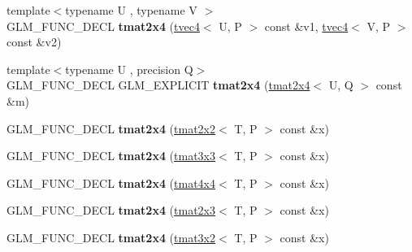 \begin{DoxyCompactItemize}
\item 
\hypertarget{structglm_1_1tmat2x4_ab52cdbf9a2f1ae4b9b8d3e6ef8e84039}{{\footnotesize template$<$typename U , typename V $>$ }\\G\-L\-M\-\_\-\-F\-U\-N\-C\-\_\-\-D\-E\-C\-L {\bfseries tmat2x4} (\hyperlink{structglm_1_1tvec4}{tvec4}$<$ U, P $>$ const \&v1, \hyperlink{structglm_1_1tvec4}{tvec4}$<$ V, P $>$ const \&v2)}\label{structglm_1_1tmat2x4_ab52cdbf9a2f1ae4b9b8d3e6ef8e84039}

\item 
\hypertarget{structglm_1_1tmat2x4_a927ed33ecafc04dffbdc44b25e4b5466}{{\footnotesize template$<$typename U , precision Q$>$ }\\G\-L\-M\-\_\-\-F\-U\-N\-C\-\_\-\-D\-E\-C\-L G\-L\-M\-\_\-\-E\-X\-P\-L\-I\-C\-I\-T {\bfseries tmat2x4} (\hyperlink{structglm_1_1tmat2x4}{tmat2x4}$<$ U, Q $>$ const \&m)}\label{structglm_1_1tmat2x4_a927ed33ecafc04dffbdc44b25e4b5466}

\item 
\hypertarget{structglm_1_1tmat2x4_a8ce9dd0ef9d5a2b4f0d5a37b155be723}{G\-L\-M\-\_\-\-F\-U\-N\-C\-\_\-\-D\-E\-C\-L {\bfseries tmat2x4} (\hyperlink{structglm_1_1tmat2x2}{tmat2x2}$<$ T, P $>$ const \&x)}\label{structglm_1_1tmat2x4_a8ce9dd0ef9d5a2b4f0d5a37b155be723}

\item 
\hypertarget{structglm_1_1tmat2x4_ac456420dac8a191a04a73cb57b9d6546}{G\-L\-M\-\_\-\-F\-U\-N\-C\-\_\-\-D\-E\-C\-L {\bfseries tmat2x4} (\hyperlink{structglm_1_1tmat3x3}{tmat3x3}$<$ T, P $>$ const \&x)}\label{structglm_1_1tmat2x4_ac456420dac8a191a04a73cb57b9d6546}

\item 
\hypertarget{structglm_1_1tmat2x4_a7079e832bf683810f728882873c71037}{G\-L\-M\-\_\-\-F\-U\-N\-C\-\_\-\-D\-E\-C\-L {\bfseries tmat2x4} (\hyperlink{structglm_1_1tmat4x4}{tmat4x4}$<$ T, P $>$ const \&x)}\label{structglm_1_1tmat2x4_a7079e832bf683810f728882873c71037}

\item 
\hypertarget{structglm_1_1tmat2x4_a8bb5af5a09621863420b6f321f31b7ff}{G\-L\-M\-\_\-\-F\-U\-N\-C\-\_\-\-D\-E\-C\-L {\bfseries tmat2x4} (\hyperlink{structglm_1_1tmat2x3}{tmat2x3}$<$ T, P $>$ const \&x)}\label{structglm_1_1tmat2x4_a8bb5af5a09621863420b6f321f31b7ff}

\item 
\hypertarget{structglm_1_1tmat2x4_af35f19e3782e09ebc775f0e57bedc837}{G\-L\-M\-\_\-\-F\-U\-N\-C\-\_\-\-D\-E\-C\-L {\bfseries tmat2x4} (\hyperlink{structglm_1_1tmat3x2}{tmat3x2}$<$ T, P $>$ const \&x)}\label{structglm_1_1tmat2x4_af35f19e3782e09ebc775f0e57bedc837}


\end{DoxyCompactItemize}
